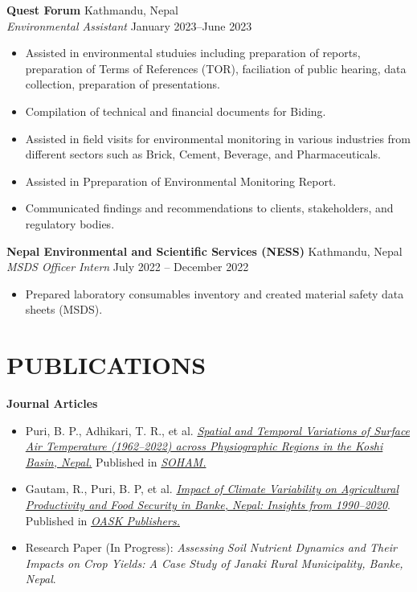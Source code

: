 \documentclass[a4paper, 09pt]{extarticle}
\begin{document}
\noindent
\textbf{Quest Forum} \hfill Kathmandu, Nepal\\[2pt] 
\textit{Environmental Assistant} \hfill January 2023--June 2023
\begin{itemize}
    \item Assisted in environmental studuies including preparation of reports, preparation of Terms of References (TOR), faciliation of public hearing, data collection, preparation of presentations.
    \item Compilation of technical and financial documents for Biding.
    \item Assisted in field visits for environmental monitoring in various industries from different sectors such as Brick, Cement, Beverage, and Pharmaceuticals.
    \item Assisted in Ppreparation of Environmental Monitoring Report.
    \item Communicated findings and recommendations to clients, stakeholders, and regulatory bodies.
\end{itemize}

\noindent
\textbf{Nepal Environmental and Scientific Services (NESS)} \hfill Kathmandu, Nepal\\[2pt] 
\textit{MSDS Officer Intern} \hfill July 2022 -- December 2022
\begin{itemize}
    \item Prepared laboratory consumables inventory and created material safety data sheets (MSDS).
\end{itemize}

\section*{PUBLICATIONS}
\noindent
\textbf{Journal Articles}
\begin{itemize}
    \item Puri, B. P., Adhikari, T. R., et al. \href{https://doi.org/10.3126/jhm.v12i1.72654}{\textit{Spatial and Temporal Variations of Surface Air Temperature (1962–2022) across Physiographic Regions in the Koshi Basin, Nepal.}} Published in \href{https://soham.org.np/}{\textit{SOHAM.}}
    \item Gautam, R., Puri, B. P, et al. \href{https://oaskpublishers.com/assets/article-pdf/impact-of-climate-variability-on-agricultural-productivity-and-food-security--in-banke-nepal-insights-from-1990-2020.pdf}{\textit{Impact of Climate Variability on Agricultural Productivity and Food Security in Banke, Nepal: Insights from 1990--2020}}. Published in \href{https://oaskpublishers.com/}{\textit{OASK Publishers.}}
    \item Research Paper (In Progress): \textit{Assessing Soil Nutrient Dynamics and Their Impacts on Crop Yields: A Case Study of Janaki Rural Municipality, Banke, Nepal}. 
\end{itemize}
\end{document}
